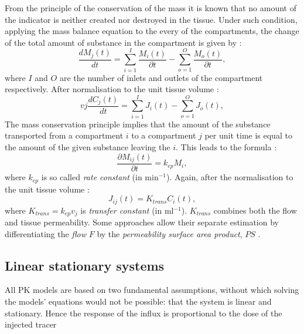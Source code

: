 From the principle of the conservation of the mass it is known that no amount of the indicator is neither created nor destroyed in the tissue. Under such condition, applying the mass balance equation to the every of the compartments, the change of the total amount of substance in the compartment is given by \cite{thesis}:
\begin{equation}
\frac{dM_j(t)}{dt} = \sum_{i=1}^{I}\frac{M_i(t)}{\partial t}-\sum_{o=1}^{O}\frac{M_o(t)}{\partial t} ,
\label{eq:pk4}
\end{equation}
where $I$ and $O$ are the number of inlets and outlets of the compartment respectively. 
After normalisation to the unit tissue volume \cite{thesis}:
\begin{equation}
vj\frac{dC_j(t)}{dt} = \sum_{i=1}^{I}J_i(t)-\sum_{o=1}^{O}J_o(t) ,
\label{eq:pk5}
\end{equation}
The mass conservation principle implies that the amount of the substance transported from a compartment $i$ to a compartment $j$ per unit time is equal to the amount of the given substance leaving the $i$. This leads to the formula \cite{thesis}:
\begin{equation}
\frac{\partial M_{ij}(t)}{\partial t} = k_{ep}M_i,
\label{eq:pk6}
\end{equation}
where $k_{ep}$ is so called \textit{rate constant} (in min$^{-1}$). Again, after the normalisation to the unit tissue volume \cite{thesis}:
\begin{equation}
J_{ij}(t) = K_{trans}C_i(t),
\label{eq:pk7}
\end{equation}
where $K_{trans}=k_{ep}v_j$ is \textit{transfer constant} (in ml$^{-1}$). $K_{trans}$ combines both the flow and tissue permeability. Some approaches allow their separate estimation by differentiating the \textit{flow} $F$ by the \textit{permeability surface area product}, $PS$ \cite{thesis}. 

\subsection{Linear stationary systems}
All PK models are based on two fundamental assumptions, without which solving the models' equations would not be possible: that the system is linear and stationary. Hence the response of the influx is proportional to the dose of the injected tracer \cite{thesis, sourbron2011scope} 

